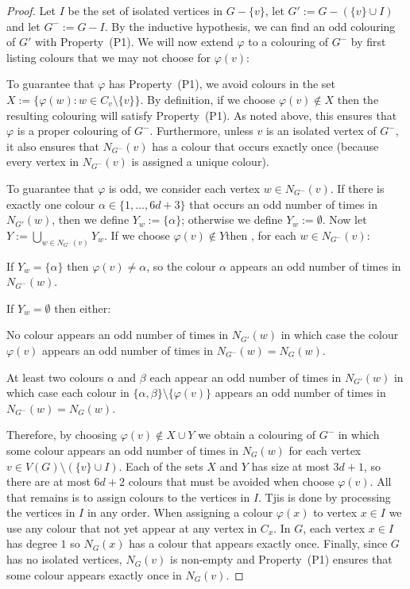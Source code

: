 \documentclass{patmorin}
\begin{document}
\begin{proof}
  Let $I$ be the set of isolated vertices in $G-\{v\}$, let $G':=G-(\{v\}\cup I)$ and let $G^-:=G-I$.  By the inductive hypothesis, we can find an odd colouring of $G'$ with Property~(P1).  We will now extend $\varphi$ to a colouring of $G^-$ by first listing colours that we may not choose for $\varphi(v)$:
  \begin{compactitem}
    \item To guarantee that $\varphi$ has Property~(P1), we avoid colours in the set $X:= \{\varphi(w): w\in C_v\setminus\{v\}\}$. By definition, if we choose $\varphi(v)\not\in X$ then the resulting colouring will satisfy Property~(P1).  As noted above, this ensures that $\varphi$ is a proper colouring of $G^-$.  Furthermore, unless $v$ is an isolated vertex of $G^-$, it also ensures that $N_{G^-}(v)$ has a colour that occurs exactly once (because every vertex in $N_{G^-}(v)$ is assigned a unique colour).

    \item To guarantee that $\varphi$ is odd, we consider each vertex $w\in N_{G^-}(v)$.  If there is exactly one colour $\alpha\in\{1,\ldots,6d+3\}$ that occurs an odd number of times in $N_{G'}(w)$, then we define $Y_{w} := \{\alpha\}$; otherwise we define $Y_{w}:=\emptyset$. Now let $Y:=\bigcup_{w\in N_{G^-}(v)} Y_{w}$.
    If we choose $\varphi(v)\not\in Y $then , for each $w\in N_{G^-}(v)$:
    \begin{compactitem}
      \item If $Y_{w}=\{\alpha\}$ then $\varphi(v)\neq\alpha$, so the colour $\alpha$ appears an odd number of times in $N_{G^-}(w)$.
      \item If $Y_{w}=\emptyset$ then either:
      \begin{compactenum}
        \item No colour appears an odd number of times in $N_{G'}(w)$ in which case the colour $\varphi(v)$ appears an odd number of times in $N_{G^-}(w)=N_G(w)$.
        \item At least two colours $\alpha$ and $\beta$ each appear an odd number of times in $N_{G'}(w)$ in which case each colour in $\{\alpha,\beta\}\setminus\{\varphi(v)\}$ appears an odd number of times in $N_{G^-}(w)=N_G(w)$.
      \end{compactenum}
    \end{compactitem}
  \end{compactitem}
  Therefore, by choosing $\varphi(v)\not\in X\cup Y$ we obtain a colouring of $G^-$ in which some colour appears an odd number of times in $N_G(w)$ for each vertex $v\in V(G)\setminus (\{v\}\cup I)$.
  Each of the sets $X$ and $Y$ has size at most $3d+1$, so there are at most $6d+2$ colours that must be avoided when choose $\varphi(v)$.  All that remains is to assign colours to the vertices in $I$.  Tjis is done by  processing the vertices in $I$ in any order. When assigning a colour $\varphi(x)$ to vertex $x\in I$ we use any colour that not yet appear at any vertex in $C_x$. In $G$, each vertex $x\in I$ has degree $1$ so $N_G(x)$ has a colour that appears exactly once.  Finally, since $G$ has no isolated vertices, $N_G(v)$ is non-empty and Property~(P1) ensures that some colour appears exactly once in $N_G(v)$.
\end{proof}
\end{document}
